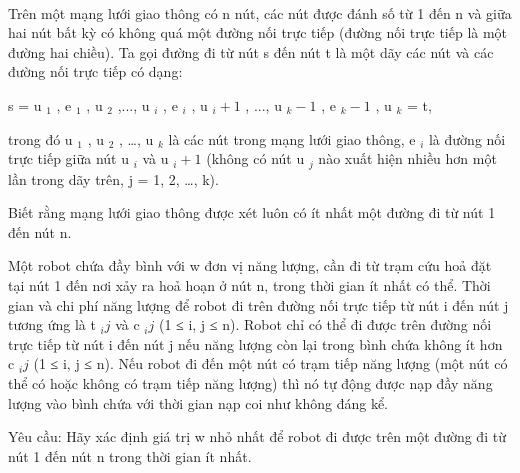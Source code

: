  

Trên một mạng lưới giao thông có n nút, các nút được đánh số từ 1 đến n và giữa hai nút bất kỳ có không quá một đường nối trực tiếp (đường nối trực tiếp là một đường hai chiều). Ta gọi đường đi từ nút s đến nút t là một dãy các nút và các đường nối trực tiếp có dạng:

s = u $_ 1 $ , e $_ 1 $ , u $_ 2 $ ,..., u $_ i $ , e $_ i $ , u $_ i+1 $ , ..., u $_ k-1 $ , e $_ k-1 $ , u $_ k $ = t,

trong đó u $_ 1 $ , u $_ 2 $ , …, u $_ k $ là các nút trong mạng lưới giao thông, e $_ i $ là đường nối trực tiếp giữa nút u $_ i $ và u $_ i+1 $ (không có nút u $_ j $ nào xuất hiện nhiều hơn một lần trong dãy trên, j = 1, 2, …, k).

Biết rằng mạng lưới giao thông được xét luôn có ít nhất một đường đi từ nút 1 đến nút n.

Một robot chứa đầy bình với w đơn vị năng lượng, cần đi từ trạm cứu hoả đặt tại nút 1 đến nơi xảy ra hoả hoạn ở nút n, trong thời gian ít nhất có thể. Thời gian và chi phí năng lượng để robot đi trên đường nối trực tiếp từ nút i đến nút j tương ứng là t $_ ij $ và c $_ ij $ (1 ≤ i, j ≤ n). Robot chỉ có thể đi được trên đường nối trực tiếp từ nút i đến nút j nếu năng lượng còn lại trong bình chứa không ít hơn c $_ ij $ (1 ≤ i, j ≤ n). Nếu robot đi đến một nút có trạm tiếp năng lượng (một nút có thể có hoặc không có trạm tiếp năng lượng) thì nó tự động được nạp đầy năng lượng vào bình chứa với thời gian nạp coi như không đáng kể.

Yêu cầu: Hãy xác định giá trị w nhỏ nhất để robot đi được trên một đường đi từ nút 1 đến nút n trong thời gian ít nhất.